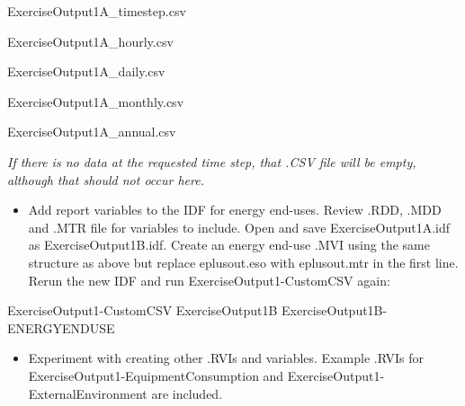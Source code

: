 ExerciseOutput1A\_timestep.csv

ExerciseOutput1A\_hourly.csv

ExerciseOutput1A\_daily.csv

ExerciseOutput1A\_monthly.csv

ExerciseOutput1A\_annual.csv

\emph{If there is no data at the requested time step, that .CSV file will be empty, although that should not occur here.}

\begin{itemize}
\tightlist
\item
  Add report variables to the IDF for energy end-uses. Review .RDD, .MDD and .MTR file for variables to include. Open and save ExerciseOutput1A.idf as ExerciseOutput1B.idf. Create an energy end-use .MVI using the same structure as above but replace eplusout.eso with eplusout.mtr in the first line. Rerun the new IDF and run ExerciseOutput1-CustomCSV again:
\end{itemize}

ExerciseOutput1-CustomCSV ExerciseOutput1B ExerciseOutput1B-ENERGYENDUSE

\begin{itemize}
\tightlist
\item
  Experiment with creating other .RVIs and variables. Example .RVIs for ExerciseOutput1-EquipmentConsumption and ExerciseOutput1-ExternalEnvironment are included.
\end{itemize}
